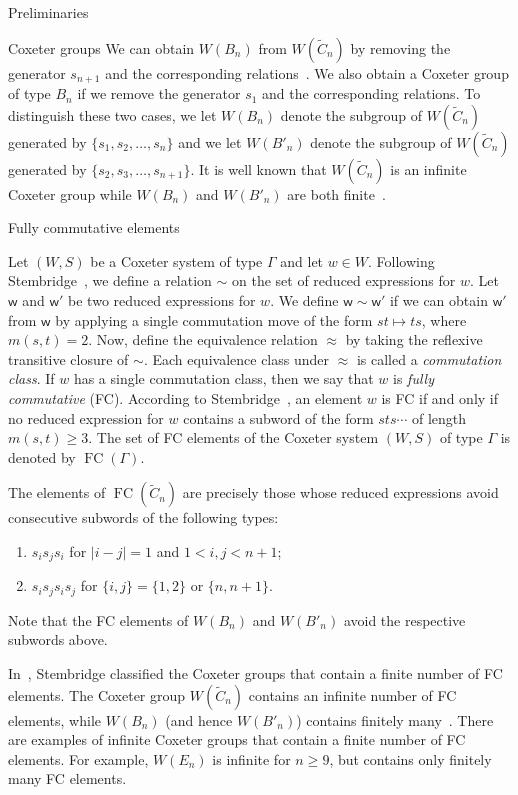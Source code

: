 \documentclass[11pt]{amsart}
\theoremstyle{definition}
\numberwithin{equation}{section}
\newcommand{\C}{\widetilde{C}}
\renewcommand{\(}{\left(}
\renewcommand{\)}{\right)}
\newcommand{\w}{\mathsf{w}}
\DeclareMathOperator{\FC}{FC}
\begin{document}
\begin{section}{Preliminaries}
\begin{subsection}{Coxeter groups}
We can obtain $W(B_{n})$ from $W(\C_{n})$ by removing the generator $s_{n+1}$ and the corresponding relations~\cite[Chapter 5]{Humphreys1990}.  We also obtain a Coxeter group of type $B_n$ if we remove the generator $s_{1}$ and the corresponding relations.  To distinguish these two cases, we let $W(B_{n})$ denote the subgroup of $W(\C_{n})$ generated by $\{s_{1}, s_{2}, \dots, s_{n}\}$ and we let $W(B'_{n})$ denote the subgroup of $W(\C_{n})$ generated by $\{s_{2}, s_{3}, \dots, s_{n+1}\}$.  It is well known that $W(\C_{n})$ is an infinite Coxeter group while $W(B_{n})$ and $W(B'_{n})$ are both finite~\cite[Chapters 2 and 6]{Humphreys1990}.

\end{subsection}


\begin{subsection}{Fully commutative elements}\label{subsec:FC}

Let $(W,S)$ be a Coxeter system of type $\Gamma$ and let $w \in W$. Following Stembridge~\cite{Stembridge1996}, we define a relation $\sim$ on the set of reduced expressions for $w$.  Let $\w$ and $\w'$ be two reduced expressions for $w$.  We define $\w \sim \w'$ if we can obtain $\w'$ from $\w$ by applying a single commutation move of the form $st \mapsto ts$, where $m(s,t)=2$.  Now, define the equivalence relation $\approx$ by taking the reflexive transitive closure of $\sim$.  Each equivalence class under $\approx$ is called a \emph{commutation class}. If $w$ has a single commutation class, then we say that $w$ is \emph{fully commutative} (FC).  According to Stembridge~\cite{Stembridge1996}, an element $w$ is FC if and only if no reduced expression for $w$ contains a subword of the form $sts \cdots$ of length $m(s,t) \geq 3$.  The set of FC elements of the Coxeter system $(W,S)$ of type $\Gamma$ is denoted by $\FC(\Gamma)$.

The elements of $\FC(\C_{n})$ are precisely those whose reduced expressions avoid consecutive subwords of the following types:
\begin{enumerate}
\item $s_{i}s_{j}s_{i}$ for $|i-j|=1$ and $1< i,j < n+1$;
\item $s_{i}s_{j}s_{i}s_{j}$ for $\{i,j\}=\{1,2\}$ or $\{n,n+1\}$.
\end{enumerate}
Note that the FC elements of $W(B_{n})$ and $W(B'_{n})$ avoid the respective subwords above.

In~\cite{Stembridge1996}, Stembridge classified the Coxeter groups that contain a finite number of FC elements.  The Coxeter group $W(\C_{n})$ contains an infinite number of FC elements, while $W(B_{n})$ (and hence $W(B'_n)$) contains finitely many~\cite[Theorem 5.1]{Stembridge1996}.  There are examples of infinite Coxeter groups that contain a finite number of FC elements.  For example, $W(E_n)$ is infinite for $n\geq 9$, but contains only finitely many FC elements.


\end{subsection}
\end{section}
\end{document}
